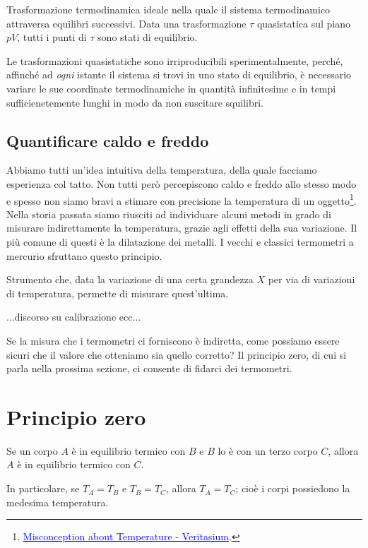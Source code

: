 \begin{tcolorbox}[colback = yellow!30, colframe = yellow!30!black, title = {Trasformazione quasistatica}]
    Trasformazione termodinamica ideale nella quale il sistema termodinamico
    attraversa equilibri successivi. Data una trasformazione $\tau$ quasistatica
    sul piano $pV$, tutti i punti di $\tau$ sono stati di equilibrio.
\end{tcolorbox}

\noindent Le trasformazioni quasistatiche sono irriproducibili sperimentalmente,
perché, affinché ad \textit{ogni} istante il sistema si trovi in uno stato
di equilibrio, è necessario variare le sue coordinate termodinamiche in
quantità infinitesime e in tempi sufficienetemente lunghi in modo da non
suscitare squilibri.



\subsection{Quantificare caldo e freddo}
Abbiamo tutti un'idea intuitiva della temperatura, della quale facciamo
esperienza col tatto. Non tutti però percepiscono caldo e freddo allo
stesso modo e spesso non siamo bravi a stimare con precisione la
temperatura di un oggetto\footnote{\href{https://www.youtube.com/watch?v=vqDbMEdLiCs}{\textcolor{blue}{Misconception about Temperature - Veritasium}}.}.
Nella storia passata siamo riusciti ad individuare alcuni metodi in
grado di misurare indirettamente la temperatura, grazie agli effetti
della sua variazione. Il più comune di questi è la dilatazione dei
metalli. I vecchi e classici termometri a mercurio sfruttano questo
principio.

\begin{tcolorbox}[colback = yellow!30, colframe = yellow!30!black, title = {Termometro}]
Strumento che, data la variazione di una certa grandezza $X$ per
via di variazioni di temperatura, permette di misurare quest'ultima.
\end{tcolorbox}

...discorso su calibrazione ecc...

Se la misura che i termometri ci forniscono è indiretta, come possiamo
essere sicuri che il valore che otteniamo sia quello corretto? Il
principio zero, di cui si parla nella prossima sezione, ci consente di fidarci dei termometri.


\section{Principio zero}
\begin{tcolorbox}[colback = red!30, colframe = red!30!black, title = {Primo zero della termodinamica}]
Se un corpo $A$ è in equilibrio termico con $B$ e $B$ lo è con un terzo
corpo $C$, allora $A$ è in equilibrio termico con $C$.

In particolare, se $T_A = T_B$ e $T_B = T_C$, allora $T_A = T_C$; cioè
i corpi possiedono la medesima temperatura.
\end{tcolorbox}

